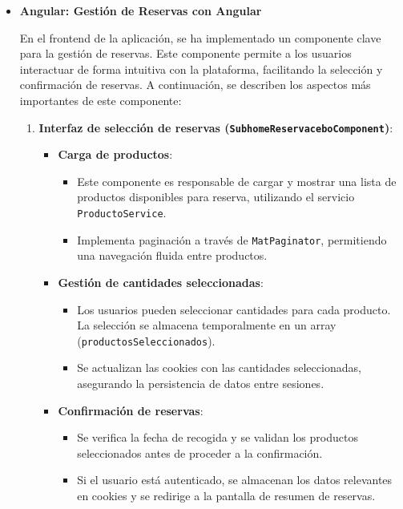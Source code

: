 \begin{itemize} \item \textbf{Angular: Gestión de Reservas con Angular}


En el frontend de la aplicación, se ha implementado un componente clave para la gestión de reservas. Este componente permite a los usuarios interactuar de forma intuitiva con la plataforma, facilitando la selección y confirmación de reservas. A continuación, se describen los aspectos más importantes de este componente:


\begin{enumerate}
    \item \textbf{Interfaz de selección de reservas (\texttt{SubhomeReservaceboComponent})}:
    \begin{itemize}
        \item \textbf{Carga de productos}:
        \begin{itemize}
            \item Este componente es responsable de cargar y mostrar una lista de productos disponibles para reserva, utilizando el servicio \texttt{ProductoService}.
            \item Implementa paginación a través de \texttt{MatPaginator}, permitiendo una navegación fluida entre productos.
        \end{itemize}
        
        \item \textbf{Gestión de cantidades seleccionadas}:
        \begin{itemize}
            \item Los usuarios pueden seleccionar cantidades para cada producto. La selección se almacena temporalmente en un array (\texttt{productosSeleccionados}).
            \item Se actualizan las cookies con las cantidades seleccionadas, asegurando la persistencia de datos entre sesiones.
        \end{itemize}
        
        \item \textbf{Confirmación de reservas}:
        \begin{itemize}
            \item Se verifica la fecha de recogida y se validan los productos seleccionados antes de proceder a la confirmación.
            \item Si el usuario está autenticado, se almacenan los datos relevantes en cookies y se redirige a la pantalla de resumen de reservas.
        \end{itemize}
    \end{itemize}


\end{enumerate}
\end{itemize}
